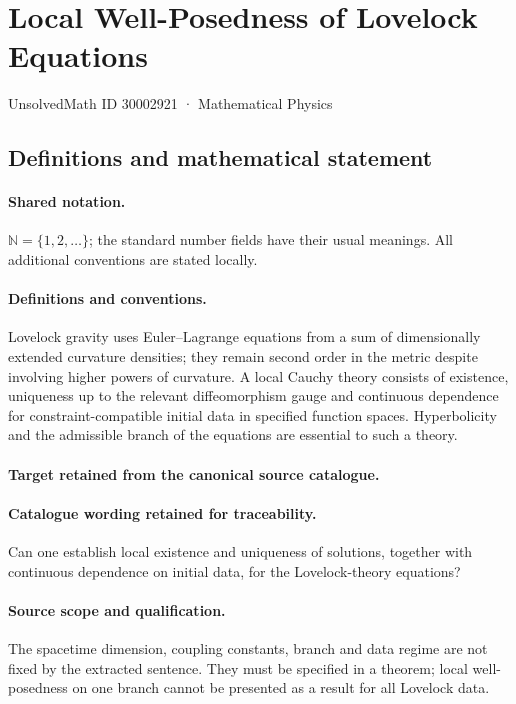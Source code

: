\documentclass[11pt]{article}
\begin{document}
\setcounter{section}{30002920}
\section{Local Well-Posedness of Lovelock Equations}\label{30002921}
{\small UnsolvedMath ID 30002921 · Mathematical Physics}
\subsection{Definitions and mathematical statement}

\paragraph{Shared notation.}$\mathbb N=\{1,2,\ldots\}$; the standard number fields have their usual meanings. All additional conventions are stated locally.


\paragraph{Definitions and conventions.}
Lovelock gravity uses Euler--Lagrange equations from a sum of dimensionally extended curvature densities; they remain second order in the metric despite involving higher powers of curvature. A local Cauchy theory consists of existence, uniqueness up to the relevant diffeomorphism gauge and continuous dependence for constraint-compatible initial data in specified function spaces. Hyperbolicity and the admissible branch of the equations are essential to such a theory.

\paragraph{Target retained from the canonical source catalogue.}
\paragraph{Catalogue wording retained for traceability.}
Can one establish local existence and uniqueness of solutions, together with continuous dependence on initial data, for the Lovelock-theory equations?

\paragraph{Source scope and qualification.}
The spacetime dimension, coupling constants, branch and data regime are not fixed by the extracted sentence. They must be specified in a theorem; local well-posedness on one branch cannot be presented as a result for all Lovelock data.
\end{document}
